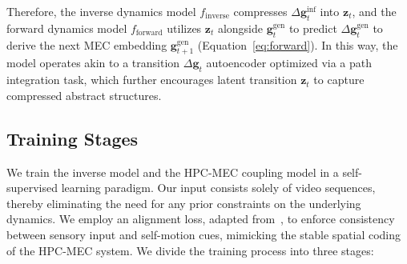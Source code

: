 Therefore, the inverse dynamics model $f_{\text{inverse}}$ compresses $\Delta \boldsymbol{g}_{t}^{\text{inf}}$ into $\boldsymbol{z}_t$, and the forward dynamics model $f_{\text{forward}}$ utilizes $\boldsymbol{z}_t$ alongside $\boldsymbol{g}_{t}^{\text{gen}}$ to predict $\Delta \boldsymbol{g}_{t}^{\text{gen}}$ to derive the next MEC embedding $\boldsymbol{g}_{t+1}^{\text{gen}}$ (Equation~\ref{eq:forward}). In this way, the model operates akin to a transition $\Delta \boldsymbol{g}_{t}$ autoencoder optimized via a path integration task, which further encourages latent transition $\boldsymbol{z}_t$ to capture compressed abstract structures.

\subsection{Training Stages}
\label{methods:training_phases}
We train the inverse model and the HPC-MEC coupling model in a self-supervised learning paradigm. Our input consists solely of video sequences, thereby eliminating the need for any prior constraints on the underlying dynamics. 
We employ an alignment loss, adapted from~\cite{TolmanEichenbaumMachineUnifying2020}, to enforce consistency between sensory input and self-motion cues, mimicking the stable spatial coding of the HPC-MEC system.
We divide the training process into three stages:
